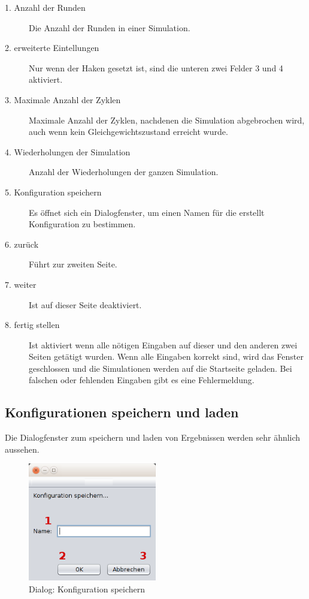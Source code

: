 \begin{description}

\item[1. Anzahl der Runden] Die Anzahl der Runden in einer Simulation. 

\item[2. erweiterte Eintellungen] Nur wenn der Haken gesetzt ist, sind die unteren zwei Felder 3 und 4 aktiviert.

\item[3. Maximale Anzahl der Zyklen] Maximale Anzahl der Zyklen, nachdenen die Simulation abgebrochen wird, auch wenn kein Gleichgewichtszustand erreicht wurde.

\item[4. Wiederholungen der Simulation] Anzahl der Wiederholungen der ganzen Simulation.

\item[5. Konfiguration speichern] Es öffnet sich ein Dialogfenster, um einen Namen für die erstellt Konfiguration zu bestimmen.

\item[6. zurück] Führt zur zweiten Seite.

\item[7. weiter] Ist auf dieser Seite deaktiviert.

\item[8. fertig stellen] Ist aktiviert wenn alle nötigen Eingaben auf dieser und den anderen zwei Seiten getätigt wurden. Wenn alle Eingaben korrekt sind, wird das Fenster geschlossen und die Simulationen werden auf die Startseite geladen. Bei falschen oder fehlenden Eingaben gibt es eine Fehlermeldung.

\end{description}


\subsection{Konfigurationen speichern und laden}

Die Dialogfenster zum speichern und laden von Ergebnissen werden sehr ähnlich aussehen.

\begin{figure}[hp] 
  \centering
     \includegraphics[width=0.5\textwidth]{GUI_Entwurf/KonfigSpeichern.png}
  \caption{Dialog: Konfiguration speichern}
  \label{fig:Bild5}
\end{figure}

